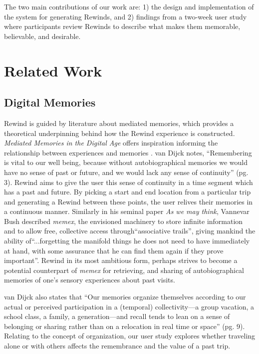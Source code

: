 \documentclass{sigchi}
\begin{document}
The two main contributions of our work are: 1) the design and implementation of the system for generating Rewinds, and 2) findings from a two-week user study where participants review Rewinds to describe what makes them memorable, believable, and desirable.

\section{Related Work}
\subsection{Digital Memories}
Rewind is guided by literature about mediated memories, which provides a theoretical underpinning behind how the Rewind experience is constructed. \textit{Mediated Memories in the Digital Age} offers inspiration informing the relationship between experiences and memories \cite{van2007mediated}. van Dijck notes, ``Remembering is vital to our well being, because without autobiographical memories we would have no sense of past or future, and we would lack any sense of continuity'' (pg. 3). Rewind aims to give the user this sense of continuity in a time segment which has a past and future. By picking a start and end location from a particular trip and generating a Rewind between these points, the user relives their memories in a continuous manner. Similarly in his seminal paper \textit{As we may think}, Vannevar Bush described \textit{memex}, the envisioned machinery to store infinite information and to allow free, collective access through``associative trails'', giving mankind the ability of``...forgetting the manifold things he does not need to have immediately at hand, with some assurance that he can find them again if they prove important''. Rewind in its most ambitious form, perhaps strives to become a potential counterpart of \textit{memex} for retrieving, and sharing of autobiographical memories of one’s sensory experiences about past visits.

van Dijck also states that ``Our memories organize themselves according to our actual or perceived participation in a (temporal) collectivity---a group vacation, a school class, a family, a generation---and recall tends to lean on a sense of belonging or sharing rather than on a relocation in real time or space'' (pg. 9). Relating to the concept of organization, our user study explores whether traveling alone or with others affects the remembrance and the value of a past trip. 
\end{document}
